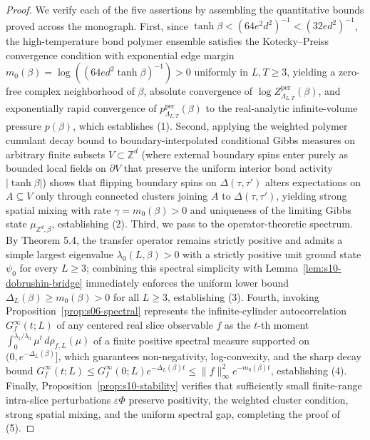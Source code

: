 \documentclass[11pt]{article}
\theoremstyle{definition}
\begin{document}
\begin{proof}
We verify each of the five assertions by assembling the quantitative bounds proved
across the monograph. First, since $\tanh \beta < (64 e^2 d^2)^{-1} < (32 e
d^2)^{-1}$, the high-temperature bond polymer ensemble satisfies the Kotecky--Preiss
convergence condition with exponential edge margin $m_0(\beta) = \log((64 e d^2
\tanh \beta)^{-1}) > 0$ uniformly in $L, T \ge 3$, yielding a zero-free complex
neighborhood of $\beta$, absolute convergence of $\log
Z_{\Lambda_{L,T}}^{\mathrm{per}}(\beta)$, and exponentially rapid convergence of
$p_{\Lambda_{L,T}}^{\mathrm{per}}(\beta)$ to the real-analytic infinite-volume
pressure $p(\beta)$, which establishes (1). Second, applying the weighted polymer
cumulant decay bound to boundary-interpolated conditional Gibbs measures on
arbitrary finite subsets $V \subset \mathbb{Z}^d$ (where external boundary spins
enter purely as bounded local fields on $\partial V$ that preserve the uniform
interior bond activity $|\tanh \beta|$) shows that flipping boundary spins on
$\Delta(\tau, \tau')$ alters expectations on $A \subseteq V$ only through connected
clusters joining $A$ to $\Delta(\tau, \tau')$, yielding strong spatial mixing with
rate $\gamma = m_0(\beta) > 0$ and uniqueness of the limiting Gibbs state
$\mu_{\mathbb{Z}^d, \beta}$, establishing (2). Third, we pass to the
operator-theoretic spectrum. By Theorem 5.4, the transfer operator remains strictly
positive and admits a simple largest eigenvalue $\lambda_0(L, \beta) > 0$ with a
strictly positive unit ground state $\psi_0$ for every $L \ge 3$; combining this
spectral simplicity with Lemma~\ref{lem:s10-dobrushin-bridge} immediately enforces
the uniform lower bound $\Delta_L(\beta) \ge m_0(\beta) > 0$ for all $L \ge 3$,
establishing (3). Fourth, invoking Proposition~\ref{prop:s06-spectral} represents
the infinite-cylinder autocorrelation $G_f^\infty(t; L)$ of any centered real slice
observable $f$ as the $t$-th moment $\int_0^{\lambda_1 / \lambda_0} \mu^t \,
d\rho_{f, L}(\mu)$ of a finite positive spectral measure supported on $(0,
e^{-\Delta_L(\beta)}]$, which guarantees non-negativity, log-convexity, and the
sharp decay bound $G_f^\infty(t; L) \le G_f^\infty(0; L) e^{-\Delta_L(\beta) t} \le
\|f\|_\infty^2 e^{-m_0(\beta) t}$, establishing (4). Finally,
Proposition~\ref{prop:s10-stability} verifies that sufficiently small finite-range
intra-slice perturbations $\varepsilon \Phi$ preserve positivity, the weighted
cluster condition, strong spatial mixing, and the uniform spectral gap, completing
the proof of (5).
\end{proof}
\end{document}
